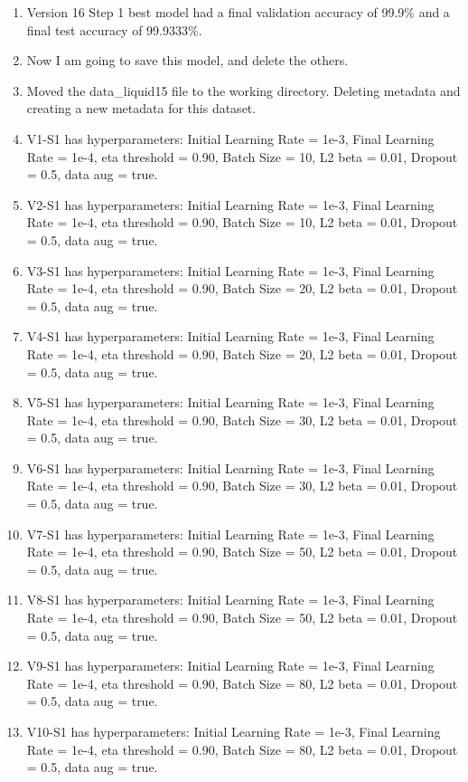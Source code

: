 \documentclass[12pt,reqno]{amsart}
\numberwithin{equation}{section}
\begin{document}
\begin{enumerate}
\item Version 16 Step 1 best model had a final validation accuracy of 99.9\% and a final test accuracy of 99.9333\%.

\item Now I am going to save this model, and delete the others.
\item Moved the data\_liquid15 file to the working directory.  Deleting metadata and creating a new metadata for this dataset.  

\item V1-S1 has hyperparameters:  Initial Learning Rate = 1e-3, Final Learning Rate = 1e-4, eta threshold = 0.90, Batch Size = 10, L2 beta = 0.01, Dropout = 0.5, data aug = true.

\item V2-S1 has hyperparameters:  Initial Learning Rate = 1e-3, Final Learning Rate = 1e-4, eta threshold = 0.90, Batch Size = 10, L2 beta = 0.01, Dropout = 0.5, data aug = true.

\item V3-S1 has hyperparameters:  Initial Learning Rate = 1e-3, Final Learning Rate = 1e-4, eta threshold = 0.90, Batch Size = 20, L2 beta = 0.01, Dropout = 0.5, data aug = true.

\item V4-S1 has hyperparameters:  Initial Learning Rate = 1e-3, Final Learning Rate = 1e-4, eta threshold = 0.90, Batch Size = 20, L2 beta = 0.01, Dropout = 0.5, data aug = true.

\item V5-S1 has hyperparameters:  Initial Learning Rate = 1e-3, Final Learning Rate = 1e-4, eta threshold = 0.90, Batch Size = 30, L2 beta = 0.01, Dropout = 0.5, data aug = true.

\item V6-S1 has hyperparameters:  Initial Learning Rate = 1e-3, Final Learning Rate = 1e-4, eta threshold = 0.90, Batch Size = 30, L2 beta = 0.01, Dropout = 0.5, data aug = true.

\item V7-S1 has hyperparameters:  Initial Learning Rate = 1e-3, Final Learning Rate = 1e-4, eta threshold = 0.90, Batch Size = 50, L2 beta = 0.01, Dropout = 0.5, data aug = true.

\item V8-S1 has hyperparameters:  Initial Learning Rate = 1e-3, Final Learning Rate = 1e-4, eta threshold = 0.90, Batch Size = 50, L2 beta = 0.01, Dropout = 0.5, data aug = true.

\item V9-S1 has hyperparameters:  Initial Learning Rate = 1e-3, Final Learning Rate = 1e-4, eta threshold = 0.90, Batch Size = 80, L2 beta = 0.01, Dropout = 0.5, data aug = true.

\item V10-S1 has hyperparameters:  Initial Learning Rate = 1e-3, Final Learning Rate = 1e-4, eta threshold = 0.90, Batch Size = 80, L2 beta = 0.01, Dropout = 0.5, data aug = true.


\end{enumerate}
\end{document}
